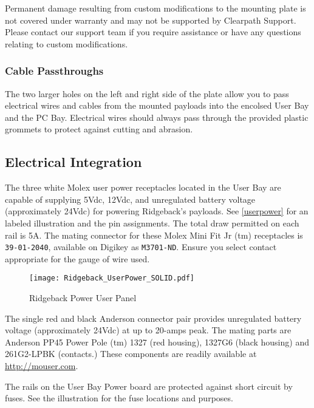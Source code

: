 \documentclass[]{clearpath-latex/clearpath-manual}
\begin{document}
\begin{warning}[]
Permanent damage resulting from custom modifications to the mounting plate is not covered under warranty and may not be supported by Clearpath Support.  Please contact our support team if you require assistance or have any questions relating to custom modifications.
\end{warning}

\subsubsection{Cable Passthroughs}

The two larger holes on the left and right side of the plate allow you to pass electrical wires and cables from the mounted payloads into the encolsed User Bay and the PC Bay.  Electrical wires should always pass through the provided plastic grommets to protect against cutting and abrasion.

\pagebreak[4]
\subsection{Electrical Integration}
\label{electrical}

The three white Molex user power receptacles located in the User Bay are capable of supplying 5Vdc, 12Vdc, and unregulated battery voltage (approximately 24Vdc) for powering Ridgeback's payloads. See \autoref{userpower} for an labeled illustration and the pin assignments. The total draw permitted on each rail is 5A. The mating connector for these Molex Mini Fit Jr (tm) receptacles is \lstinline{39-01-2040}, available on Digikey as \lstinline{M3701-ND}. Ensure you select contact appropriate for the gauge of wire used.

\begin{figure}[!h]
  \centering
  \texttt{[image: Ridgeback\_UserPower\_SOLID.pdf]}
  \caption{Ridgeback Power User Panel}
  \label{userpower}
\end{figure}

The single red and black Anderson connector pair provides unregulated battery voltage (approximately 24Vdc) at up to 20-amps peak. The mating parts are Anderson PP45 Power Pole (tm) 1327 (red housing), 1327G6 (black housing) and 261G2-LPBK (contacts.) These components are readily available at \url{http://mouser.com}.

The rails on the User Bay Power board are protected against short circuit by fuses. See the illustration for the fuse locations and purposes.
\end{document}
